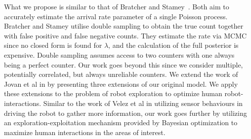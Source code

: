 What we propose is similar to that of Bratcher and Stamey~\cite{bratcher2002}. Both aim to accurately estimate the arrival rate parameter of a single Poisson process. Bratcher and Stamey utilise double sampling to obtain the true count together with false positive and false negative counts. They estimate the rate via MCMC since no closed form is found for $\lambda$, and the calculation of the full posterior is expensive. Double sampling assumes access to two counters with one always being a perfect counter. Our work goes beyond this since we consider multiple, potentially correlated, but always unreliable counters. We extend the work of Jovan et al in \cite{jovan18a} by presenting three extensions of our original model. We apply these extensions to the problem of robot exploration to optimize human robot-interactions. Similar to the work of Velez et al \cite{velez2012modelling} in utilizing sensor behaviours in driving the robot to gather more information, our work goes further by utilizing an exploration-exploitation mechanism provided by Bayesian optimization to maximize human interactions in the areas of interest.


